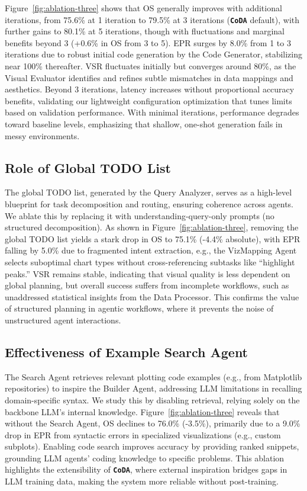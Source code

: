 \documentclass[11pt, a4paper, logo, copyright]{googlecloud}
\newcommand{\methodname}{\textbf{\texttt{\textcolor{StarIndigo}{C}\textcolor{StarIndigo}{o}\textcolor{StarCoral}{D}\textcolor{StarTeal}{A}}}}
\begin{document}
Figure~\ref{fig:ablation-three} shows that OS generally improves with additional iterations, from 75.6\% at 1 iteration to 79.5\% at 3 iterations (\methodname{} default), with further gains to 80.1\% at 5 iterations, though with fluctuations and marginal benefits beyond 3 (+0.6\% in OS from 3 to 5).
EPR surges by 8.0\% from 1 to 3 iterations due to robust initial code generation by the Code Generator, stabilizing near 100\% thereafter. VSR fluctuates initially but converges around 80\%, as the Visual Evaluator identifies and refines subtle mismatches in data mappings and aesthetics. 
Beyond 3 iterations, latency increases without proportional accuracy benefits, validating our lightweight configuration optimization that tunes limits based on validation performance. 
With minimal iterations, performance degrades toward baseline levels, emphasizing that shallow, one-shot generation fails in messy environments.

\subsection{Role of Global TODO List}

The global TODO list, generated by the Query Analyzer, serves as a high-level blueprint for task decomposition and routing, ensuring coherence across agents.
We ablate this by replacing it with understanding-query-only prompts (no structured decomposition).
As shown in Figure~\ref{fig:ablation-three}, removing the global TODO list yields a stark drop in OS to 75.1\% (-4.4\% absolute), 
with EPR falling by 5.0\% due to fragmented intent extraction, e.g., the VizMapping Agent selects suboptimal chart types without cross-referencing subtasks like ``highlight peaks.''
VSR remains stable, indicating that visual quality is less dependent on global planning, but overall success suffers from incomplete workflows, such as unaddressed statistical insights from the Data Processor. 
This confirms the value of structured planning in agentic workflows, where it prevents the noise of unstructured agent interactions.

\subsection{Effectiveness of Example Search Agent}
The Search Agent retrieves relevant plotting code examples (e.g., from Matplotlib repositories) to inspire the Builder Agent, addressing LLM limitations in recalling domain-specific syntax. We study this by disabling retrieval, relying solely on the backbone LLM's internal knowledge.
Figure~\ref{fig:ablation-three} reveals that without the Search Agent, OS declines to 76.0\% (-3.5\%), 
primarily due to a 9.0\% drop in EPR from syntactic errors in specialized visualizations (e.g., custom subplots). 
Enabling code search improves accuracy by providing ranked snippets, grounding LLM agents' coding knowledge to specific problems. This ablation highlights the extensibility of \methodname{}, where external inspiration bridges gaps in LLM training data, making the system more reliable without post-training.
\end{document}
